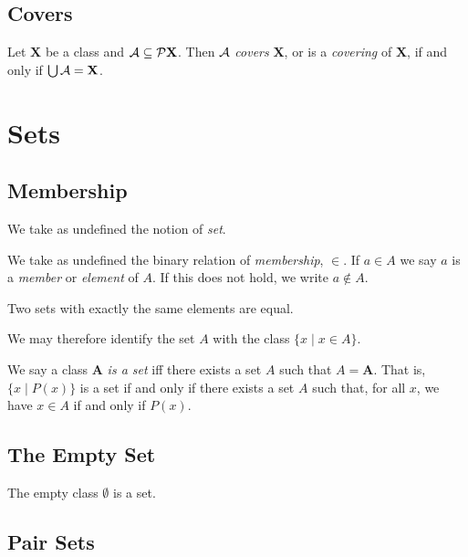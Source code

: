 \section{Covers}

\begin{definition}[Cover]
    Let $\mathbf{X}$ be a class and $\mathbf{\AA} \subseteq \pow \mathbf{X}$. 
    Then $\mathbf{\AA}$ \emph{covers} $\mathbf{X}$,
    or is a \emph{covering} of $\mathbf{X}$, if and only if
    $\bigcup \mathbf{\AA} = \mathbf{X}$.
\end{definition}

\chapter{Sets}

\section{Membership}

We take as undefined the notion of \emph{set}.

We take as undefined the binary relation of \emph{membership}, $\in$. If $a \in A$ we say $a$ is a \emph{member} or \emph{element} of $A$.
If this does not hold, we write $a \notin A$.

\begin{axiom}
    Two sets with exactly the same elements are equal.
\end{axiom}

We may therefore identify the set $A$ with the class $\{x \mid x \in A \}$.

We say a class $\mathbf{A}$ \emph{is a set} iff there exists a set $A$
such that $A = \mathbf{A}$. That is, $\{ x \mid P(x) \}$ is a set if and only
if there exists a set $A$ such that, for all $x$, we have $x \in A$ if and
only if $P(x)$.

\section{The Empty Set}

\begin{axiom}
    The empty class $\emptyset$ is a set.
\end{axiom}

\section{Pair Sets}

